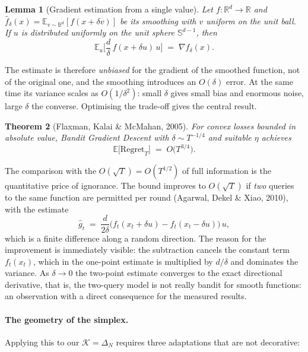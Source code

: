 \documentclass[12pt,a4paper,oneside]{report}
\renewcommand{\_}{\oldunderscore\allowbreak}
\theoremstyle{definition}
\theoremstyle{plain}
\newtheorem{theorem}{Theorem}[chapter]
\newtheorem{lemma}[theorem]{Lemma}
\theoremstyle{remark}
\begin{document}
\begin{lemma}[Gradient estimation from a single value]
\label{lem:one-point}
Let $f:\mathbb{R}^d \to \mathbb{R}$ and $\hat{f}_\delta(x) = \mathbb{E}_{v\sim \mathbb{B}^d}
[f(x+\delta v)]$ be its smoothing with $v$ uniform on the unit \emph{ball}. If $u$ is distributed
uniformly on the unit \emph{sphere} $\mathbb{S}^{d-1}$, then
\[
\mathbb{E}_u\Big[ \frac{d}{\delta}\, f(x + \delta u)\, u \Big] \;=\; \nabla \hat{f}_\delta(x).
\]
\end{lemma}

The estimate is therefore \emph{unbiased} for the gradient of the smoothed function, not of the
original one, and the smoothing introduces an $O(\delta)$ error. At the same time its variance
scales as $O(1/\delta^2)$: small $\delta$ gives small bias and enormous noise, large $\delta$ the
converse. Optimising the trade-off gives the central result.

\begin{theorem}[Flaxman, Kalai \& McMahan, 2005]
\label{thm:bgd}
For convex losses bounded in absolute value, Bandit Gradient Descent with
$\delta \sim T^{-1/4}$ and suitable $\eta$ achieves
\[
\mathbb{E}\big[\mathrm{Regret}_T\big] \;=\; O\big(T^{3/4}\big).
\]
\end{theorem}

The comparison with the $O(\sqrt{T}) = O(T^{1/2})$ of full information is the quantitative price
of ignorance. The bound improves to $O(\sqrt{T})$ if \emph{two} queries to the same function are
permitted per round (Agarwal, Dekel \& Xiao, 2010), with the estimate
\[
\hat{g}_t \;=\; \frac{d}{2\delta}\big( f_t(x_t + \delta u) - f_t(x_t - \delta u) \big)\, u,
\]
which is a finite difference along a random direction. The reason for the improvement is
immediately visible: the subtraction cancels the constant term $f_t(x_t)$, which in the one-point
estimate is multiplied by $d/\delta$ and dominates the variance. As $\delta \to 0$ the two-point
estimate converges to the exact directional derivative, that is, the two-query model is not
really bandit for smooth functions: an observation with a direct consequence for the measured
results.

\paragraph{The geometry of the simplex.} Applying this to our $\mathcal{K}=\Delta_N$ requires
three adaptations that are not decorative:
\end{document}
